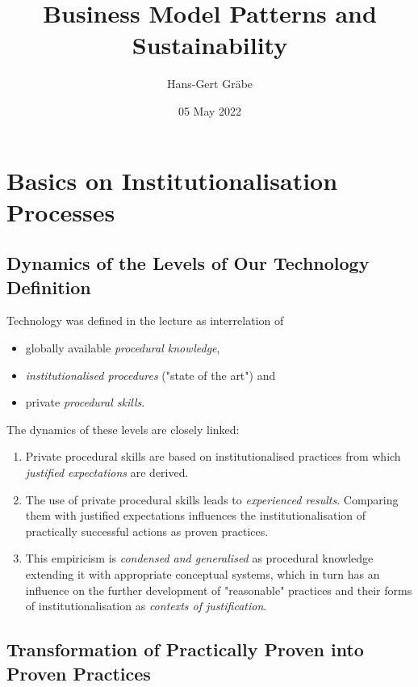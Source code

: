 \documentclass[11pt,a4paper]{article}
\title{Business Model Patterns and Sustainability}
\author{Hans-Gert Gr\"abe}
\date{05 May 2022}
\begin{document}
\maketitle
\tableofcontents
\newpage

\section{Basics on Institutionalisation Processes}

\subsection{Dynamics of the Levels of Our Technology Definition}

Technology was defined in the lecture as interrelation of
\begin{itemize}
\item globally available \emph{procedural knowledge}, 
\item \emph{institutionalised procedures} ("state of the art") and
\item private \emph{procedural skills}.
\end{itemize}

The dynamics of these levels are closely linked:
\begin{enumerate}
\item Private procedural skills are based on institutionalised practices from
  which \emph{justified expectations} are derived.
\item The use of private procedural skills leads to \emph{experienced
  results}. Comparing them with justified expectations influences the
  institutionalisation of practically successful actions as proven practices.
\item This empiricism is \emph{condensed and generalised} as procedural
  knowledge extending it with appropriate conceptual systems, which in turn
  has an influence on the further development of "reasonable" practices and
  their forms of institutionalisation as \emph{contexts of justification}.
\end{enumerate}

\subsection{Transformation of Practically Proven into Proven Practices}
\end{document}
